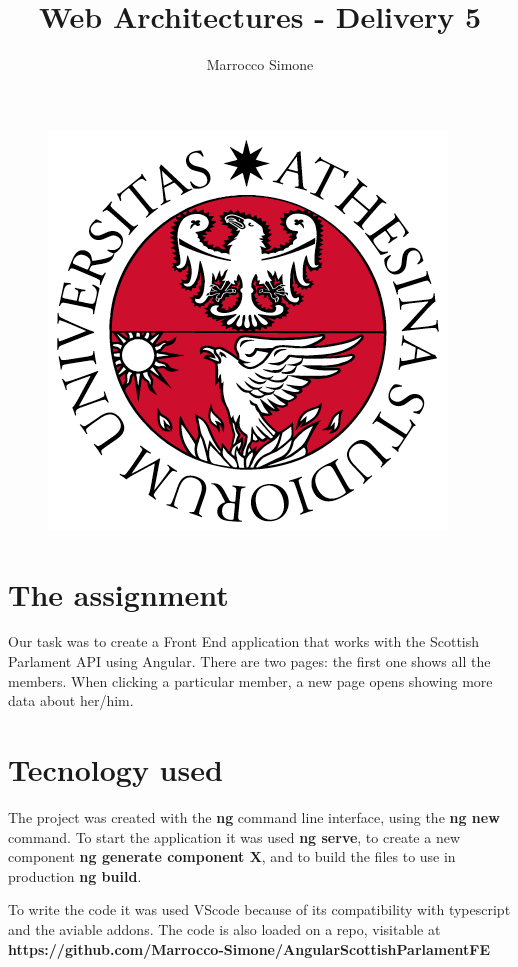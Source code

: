 \documentclass[12pt, a4paper]{article}
\title{Web Architectures - Delivery 5}
\author{Marrocco Simone}
\begin{document}
  \maketitle
  \begin{figure}[H]
    \centering
    \includegraphics[scale=0.35]{unitn.png}
  \end{figure}
  \tableofcontents
  \pagebreak

  \section{The assignment}
  Our task was to create a Front End application that works with the Scottish Parlament API using Angular. There are two pages: the first one shows all the members. When clicking a particular member, a new page opens showing more data about her/him.

  \section{Tecnology used}
  The project was created with the \textbf{ng} command line interface, using the \textbf{ng new} command. To start the application it was used \textbf{ng serve}, to create a new component \textbf{ng generate component X}, and to build the files to use in production \textbf{ng build}.

  To write the code it was used VScode because of its compatibility with typescript and the aviable addons. The code is also loaded on a repo, visitable at \\
  \textbf{https://github.com/Marrocco-Simone/AngularScottishParlamentFE}
\end{document}
